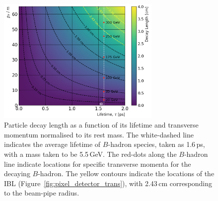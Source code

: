 \begin{figure}[!htb]
    \begin{center}
        \includegraphics[width=0.7\textwidth]{figures/bhadron_decay_length_ibl}
        \caption{
            Particle decay length as a function of its lifetime and transverse momentum normalised
            to its rest mass.
            The white-dashed line indicates the average lifetime of $B$-hadron species, taken
            as 1.6\,ps, with a mass taken to be 5.5\,GeV.
            The red-dots along the $B$-hadron line indicate locations for specific transverse momenta
            for the decaying $B$-hadron.
            The yellow contours indicate the locations of the IBL (Figure~\ref{fig:pixel_detector_trans}),
            with 2.43\,cm corresponding to the beam-pipe radius.
            {\color{red}{Perhaps move this plot elsewhere?}}
            {\color{red}{Add references to PDG}}
        }
        \label{fig:bhadron_decay_length}
    \end{center}
\end{figure}

